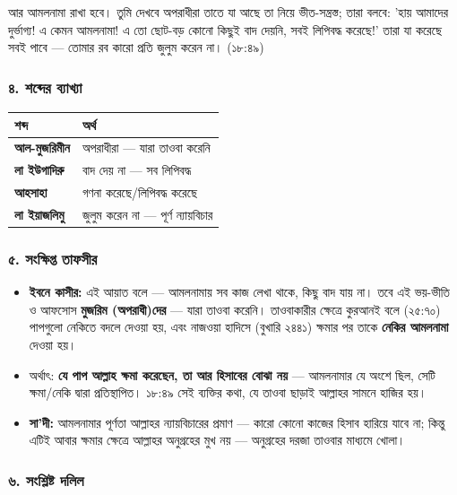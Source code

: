 আর আমলনামা রাখা হবে। তুমি দেখবে অপরাধীরা তাতে যা আছে তা নিয়ে ভীত-সন্ত্রস্ত; তারা বলবে: 'হায় আমাদের দুর্ভাগ্য! এ কেমন আমলনামা! এ তো ছোট-বড় কোনো কিছুই বাদ দেয়নি, সবই লিপিবদ্ধ করেছে!' তারা যা করেছে সবই পাবে — তোমার রব কারো প্রতি জুলুম করেন না। (১৮:৪৯)

\subsubsection*{৪. শব্দের ব্যাখ্যা}

\begin{table}[h]\centering\small
\begin{tabular}{ll}
শব্দ & অর্থ \\
\hline
\textbf{আল-মুজরিমীন} & অপরাধীরা — যারা তাওবা করেনি \\
\textbf{লা ইউগাদিরু} & বাদ দেয় না — সব লিপিবদ্ধ \\
\textbf{আহসাহা} & গণনা করেছে/লিপিবদ্ধ করেছে \\
\textbf{লা ইয়াজলিমু} & জুলুম করেন না — পূর্ণ ন্যায়বিচার \\
\hline
\end{tabular}
\end{table}

\subsubsection*{৫. সংক্ষিপ্ত তাফসীর}

\begin{itemize}
\item \textbf{ইবনে কাসীর:} এই আয়াত বলে — আমলনামায় সব কাজ লেখা থাকে, কিছু বাদ যায় না। তবে এই ভয়-ভীতি ও আফসোস \textbf{মুজরিম (অপরাধী)দের} — যারা তাওবা করেনি। তাওবাকারীর ক্ষেত্রে কুরআনই বলে (২৫:৭০) পাপগুলো নেকিতে বদলে দেওয়া হয়, এবং নাজওয়া হাদিসে (বুখারি ২৪৪১) ক্ষমার পর তাকে \textbf{নেকির আমলনামা} দেওয়া হয়।
\item অর্থাৎ: \textbf{যে পাপ আল্লাহ ক্ষমা করেছেন, তা আর হিসাবের বোঝা নয়} — আমলনামার যে অংশে ছিল, সেটি ক্ষমা/নেকি দ্বারা প্রতিস্থাপিত। ১৮:৪৯ সেই ব্যক্তির কথা, যে তাওবা ছাড়াই আল্লাহর সামনে হাজির হয়।
\item \textbf{সা'দী:} আমলনামার পূর্ণতা আল্লাহর ন্যায়বিচারের প্রমাণ — কারো কোনো কাজের হিসাব হারিয়ে যাবে না; কিন্তু এটিই আবার ক্ষমার ক্ষেত্রে আল্লাহর অনুগ্রহের মুখ নয় — অনুগ্রহের দরজা তাওবার মাধ্যমে খোলা।
\end{itemize}
\subsubsection*{৬. সংশ্লিষ্ট দলিল}

